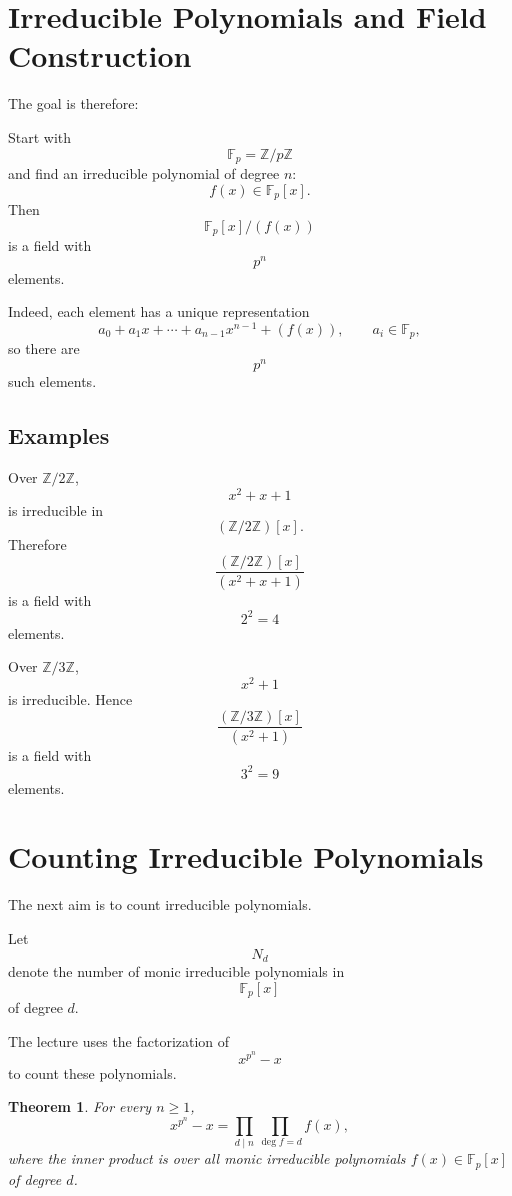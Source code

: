 \documentclass[11pt]{article}
\newtheorem{theorem}{Theorem}[section]
\theoremstyle{remark}
\newcommand{\Z}{\mathbb Z}
\newcommand{\Fp}{\mathbb F_p}
\begin{document}
\section{Irreducible Polynomials and Field Construction}

The goal is therefore:

\begin{center}
\end{center}

Start with
\[
    \Fp=\Z/p\Z
\]
and find an irreducible polynomial of degree $n$:
\[
    f(x)\in\Fp[x].
\]
Then
\[
    \boxed{
    \Fp[x]/(f(x))
    }
\]
is a field with
\[
    p^n
\]
elements.

Indeed, each element has a unique representation
\[
    a_0+a_1x+\cdots+a_{n-1}x^{n-1}+(f(x)),
    \qquad
    a_i\in\Fp,
\]
so there are
\[
    p^n
\]
such elements.

\subsection{Examples}

Over $\Z/2\Z$,
\[
    x^2+x+1
\]
is irreducible in
\[
    (\Z/2\Z)[x].
\]
Therefore
\[
    \boxed{
    \frac{(\Z/2\Z)[x]}{(x^2+x+1)}
    }
\]
is a field with
\[
    2^2=4
\]
elements.

Over $\Z/3\Z$,
\[
    x^2+1
\]
is irreducible. Hence
\[
    \boxed{
    \frac{(\Z/3\Z)[x]}{(x^2+1)}
    }
\]
is a field with
\[
    3^2=9
\]
elements.

\section{Counting Irreducible Polynomials}

The next aim is to count irreducible polynomials.

Let
\[
    N_d
\]
denote the number of monic irreducible polynomials in
\[
    \Fp[x]
\]
of degree $d$.

The lecture uses the factorization of
\[
    x^{p^n}-x
\]
to count these polynomials.

\begin{theorem}
For every $n\ge1$,
\[
    \boxed{
    x^{p^n}-x
    =
    \prod_{d\mid n}
    \prod_{\deg f=d} f(x),
    }
\]
where the inner product is over all monic irreducible polynomials
$f(x)\in\Fp[x]$ of degree $d$.
\end{theorem}
\end{document}
